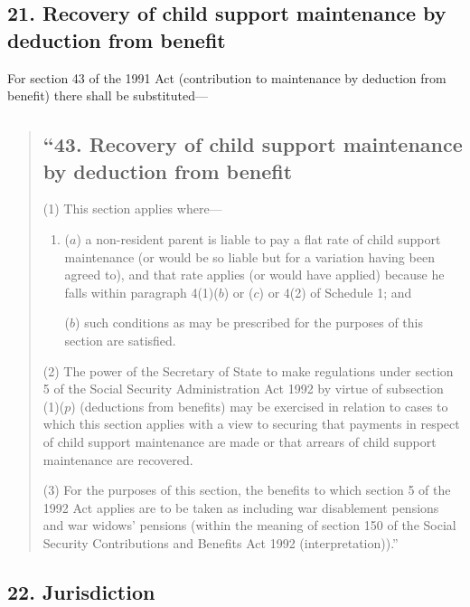 \documentclass[12pt,a4paper]{article}
\begin{document}

\subsection{21. Recovery of child support maintenance by deduction from benefit}

For section 43 of the 1991 Act (contribution to maintenance by deduction from benefit) there shall be substituted—
\begin{quotation}
\subsection*{“43. Recovery of child support maintenance by deduction from benefit}

(1) This section applies where—
\begin{enumerate}\item[]
($a$) a non-resident parent is liable to pay a flat rate of child support maintenance (or would be so liable but for a variation having been agreed to), and that rate applies (or would have applied) because he falls within paragraph 4(1)($b$)  or ($c$)  or 4(2)  of Schedule 1; and

($b$) such conditions as may be prescribed for the purposes of this section are satisfied.
\end{enumerate}

(2) The power of the Secretary of State to make regulations under section 5 of the Social Security Administration Act 1992 by virtue of subsection (1)($p$)  (deductions from benefits) may be exercised in relation to cases to which this section applies with a view to securing that payments in respect of child support maintenance are made or that arrears of child support maintenance are recovered.

(3) For the purposes of this section, the benefits to which section 5 of the 1992 Act applies are to be taken as including war disablement pensions and war widows' pensions (within the meaning of section 150 of the Social Security Contributions and Benefits Act 1992 (interpretation)).”
\end{quotation}


\subsection{22. Jurisdiction}
\end{document}
